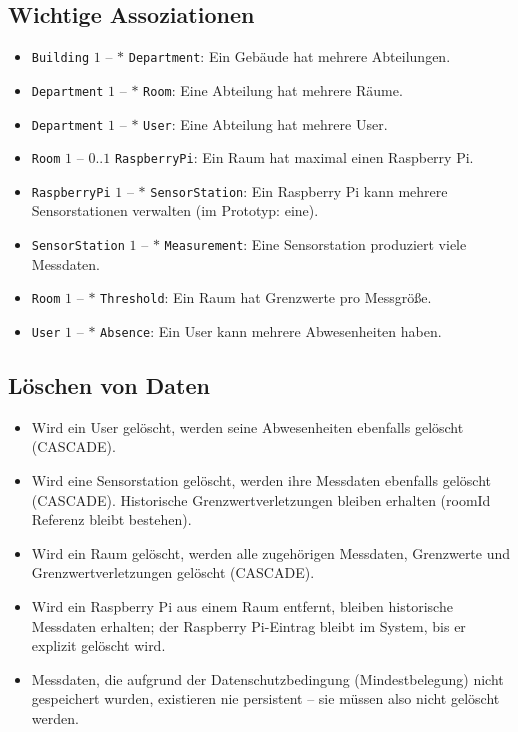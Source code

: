 \documentclass[12pt,a4paper]{article}
\begin{document}
\subsection{Wichtige Assoziationen}
\begin{itemize}
  \item \texttt{Building} $1$ -- $*$ \texttt{Department}: Ein Gebäude hat mehrere Abteilungen.
  \item \texttt{Department} $1$ -- $*$ \texttt{Room}: Eine Abteilung hat mehrere Räume.
  \item \texttt{Department} $1$ -- $*$ \texttt{User}: Eine Abteilung hat mehrere User.
  \item \texttt{Room} $1$ -- $0..1$ \texttt{RaspberryPi}: Ein Raum hat maximal einen Raspberry Pi.
  \item \texttt{RaspberryPi} $1$ -- $*$ \texttt{SensorStation}: Ein Raspberry Pi kann mehrere Sensorstationen verwalten (im Prototyp: eine).
  \item \texttt{SensorStation} $1$ -- $*$ \texttt{Measurement}: Eine Sensorstation produziert viele Messdaten.
  \item \texttt{Room} $1$ -- $*$ \texttt{Threshold}: Ein Raum hat Grenzwerte pro Messgröße.
  \item \texttt{User} $1$ -- $*$ \texttt{Absence}: Ein User kann mehrere Abwesenheiten haben.
\end{itemize}

\subsection{Löschen von Daten}
\begin{itemize}
  \item Wird ein User gelöscht, werden seine Abwesenheiten ebenfalls gelöscht (CASCADE).
  \item Wird eine Sensorstation gelöscht, werden ihre Messdaten ebenfalls gelöscht (CASCADE). Historische Grenzwertverletzungen bleiben erhalten (roomId Referenz bleibt bestehen).
  \item Wird ein Raum gelöscht, werden alle zugehörigen Messdaten, Grenzwerte und Grenzwertverletzungen gelöscht (CASCADE).
  \item Wird ein Raspberry Pi aus einem Raum entfernt, bleiben historische Messdaten erhalten; der Raspberry Pi-Eintrag bleibt im System, bis er explizit gelöscht wird.
  \item Messdaten, die aufgrund der Datenschutzbedingung (Mindestbelegung) nicht gespeichert wurden, existieren nie persistent -- sie müssen also nicht gelöscht werden.
\end{itemize}
\end{document}
